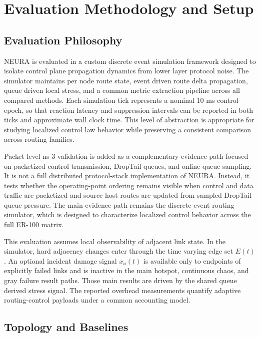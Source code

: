 \documentclass[5p,times]{elsarticle}
\begin{document}
\section{Evaluation Methodology and Setup}

\subsection{Evaluation Philosophy}

NEURA is evaluated in a custom discrete event simulation framework designed to isolate control plane propagation dynamics from lower layer protocol noise. The simulator maintains per node route state, event driven route delta propagation, queue driven local stress, and a common metric extraction pipeline across all compared methods. Each simulation tick represents a nominal $10$ ms control epoch, so that reaction latency and suppression intervals can be reported in both ticks and approximate wall clock time. This level of abstraction is appropriate for studying localized control law behavior while preserving a consistent comparison across routing families.

Packet-level ns-3 validation is added as a complementary evidence path focused on packetized control transmission, DropTail queues, and online queue sampling. It is not a full distributed protocol-stack implementation of NEURA. Instead, it tests whether the operating-point ordering remains visible when control and data traffic are packetized and source host routes are updated from sampled DropTail queue pressure. The main evidence path remains the discrete event routing simulator, which is designed to characterize localized control behavior across the full ER-100 matrix.

This evaluation assumes local observability of adjacent link state. In the simulator, hard adjacency changes enter through the time varying edge set $E(t)$. An optional incident damage signal $x_u(t)$ is available only to endpoints of explicitly failed links and is inactive in the main hotspot, continuous chaos, and gray failure result paths. Those main results are driven by the shared queue derived stress signal. The reported overhead measurements quantify adaptive routing-control payloads under a common accounting model.

\subsection{Topology and Baselines}
\end{document}
